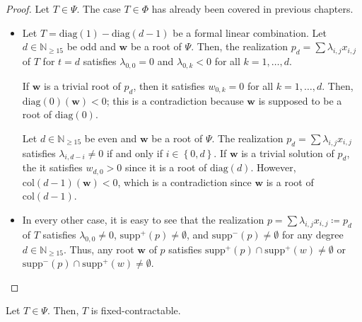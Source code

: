 \begin{proof}
    Let \( T \in \Psi \). The case \( T \in \Phi \) has already been covered in previous chapters.

    \begin{itemize}
        \item Let \( T = \mathrm{diag}(1) - \mathrm{diag}(d-1) \) be a formal linear combination. Let \( d \in \mathbb{N}_{\geq 15} \) be odd and \( \mathbf{w} \) be a root of \( \Psi \). Then, the realization \( p_d = \sum \lambda_{i,j}x_{i,j}\) of \( T \) for \( t = d \) satisfies \( \lambda_{0,0} = 0 \) and \( \lambda_{0,k} < {0} \) for all \( k = 1, \dots, d \).
    
        If \( \mathbf{w} \) is a trivial root of \( p_d \), then it satisfies \( w_{0,k} = 0 \) for all \( k = 1, \dots, d \). Then, \( \mathrm{diag}(0)(\mathbf{w}) < 0 \); this is a contradiction because \( \mathbf{w} \) is supposed to be a root of \( \mathrm{diag}(0) \).
            
            Let \( d \in \mathbb{N}_{\geq 15} \) be even and \( \mathbf{w} \) be a root of \( \Psi \). The realization \( p_d = \sum \lambda_{i,j}x_{i,j} \) satisfies \( \lambda_{i,d-i} \neq 0 \) if and only if \( i \in \left\{ 0, d \right\} \). If \( \mathbf{w} \) is a trivial solution of \( p_d \), the it satisfies \( w_{d,0} > 0 \) since it is a root of \( \mathrm{diag}(d) \). However, \( \mathrm{col}(d-1)(\mathbf{w}) < 0 \), which is a contradiction since \( \mathbf{w} \) is a root of \( \mathrm{col}(d-1) \).
        
        \item In every other case, it is easy to see that the realization \( p = \sum \lambda_{i,j} x_{i,j} \coloneqq p_d \) of \( T \) satisfies \( \lambda_{0,0} \neq 0 \), \( \mathrm{supp}^+(p) \neq \emptyset \), and \( \mathrm{supp}^-(p) \neq \emptyset \) for any degree \( d \in \mathbb{N}_{\geq 15} \). Thus, any root \( \mathbf{w} \) of \( p \) satisfies \( \mathrm{supp}^+(p) \cap \mathrm{supp}^+(w) \neq \emptyset \) or \( \mathrm{supp}^-(p) \cap \mathrm{supp}^+(w) \neq \emptyset \).
    \end{itemize}
    

    
\end{proof}

\begin{proposition}
    Let \( T \in \Psi \). Then, \( T \) is fixed-contractable.
\end{proposition}

